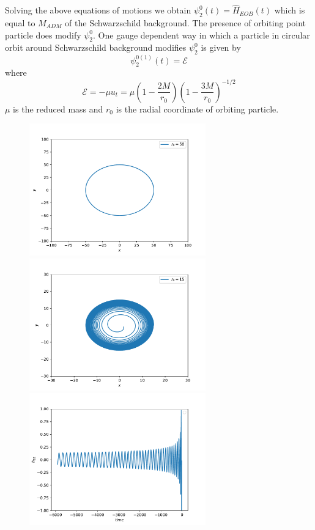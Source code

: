 \documentclass[prd,preprintnumbers,onecolumn,eqsecnum,floatfix,letter]{revtex4}
\begin{document}
Solving the above equations of motions we obtain $\psi_{2}^0(t) = \hat{H}_{EOB}(t)$ which is equal to $M_{ADM}$ of the Schwarzschild background. The presence of orbiting point particle does modify $\psi_{2}^0$. One gauge dependent way in which a particle in circular orbit around Schwarzschild background modifies $\psi_{2}^0$ is given by \cite{Merlin2016PRD}
\begin{equation}
	\psi_{2}^{0\left(1\right)}(t) = \mathcal{E}
\end{equation}
where
\begin{equation}
	\mathcal{E} = -\mu u_{t} = \mu\left(1-\frac{2M}{r_0}\right)\left(1- \frac{3M}{r_0}\right)^{-1/2}
\end{equation}
$\mu$ is the reduced mass and $r_0$ is the radial coordinate of orbiting particle.
\begin{figure}
	\includegraphics[width=3.0in]{../plots/OrbitEOB50.pdf}
	\includegraphics[width=3.0in]{../plots/OrbitEOB15.pdf}
	\includegraphics[width=3.0in]{../plots/h22EOB.pdf}

\end{figure}
\end{document}
